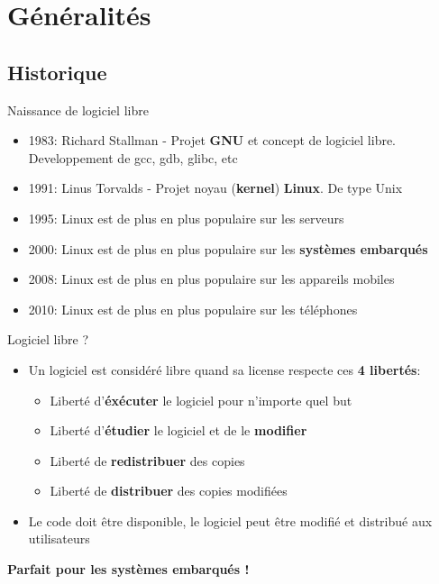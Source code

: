 \section{Généralités}

\subsection{Historique}
 \begin{frame}{Naissance de logiciel libre}{}
  \begin{itemize}
  \item 1983: Richard Stallman - Projet \textbf{GNU} et concept de logiciel libre. Developpement de gcc, gdb, glibc, etc
  \item 1991: Linus Torvalds - Projet noyau (\textbf{kernel}) \textbf{Linux}. De type Unix
  \item 1995: Linux est de plus en plus populaire sur les serveurs
  \item 2000: Linux est de plus en plus populaire sur les \textbf{systèmes embarqués}
  \item 2008: Linux est de plus en plus populaire sur les appareils mobiles
  \item 2010: Linux est de plus en plus populaire sur les téléphones
  \end{itemize}
\end{frame}

\begin{frame}{Logiciel libre ?}{}
  \begin{itemize}
  \item Un logiciel est considéré libre quand sa license respecte ces \textbf{4 libertés}:
    \begin{itemize}
    \item Liberté d'\textbf{éxécuter} le logiciel pour n'importe quel but
    \item Liberté d'\textbf{étudier} le logiciel et de le \textbf{modifier}
    \item Liberté de \textbf{redistribuer} des copies
    \item Liberté de \textbf{distribuer} des copies modifiées
    \end{itemize}
  \item Le code doit être disponible, le logiciel peut être modifié et distribué aux utilisateurs
  \end{itemize}
  \center\textbf{Parfait pour les systèmes embarqués !}
\end{frame}

